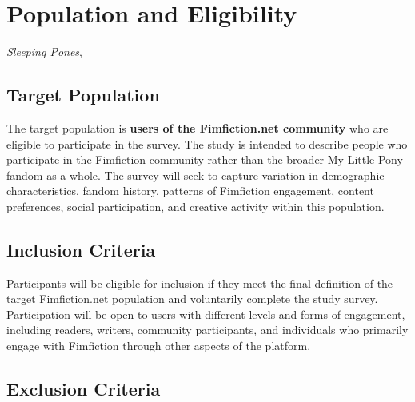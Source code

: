 \section{Population and Eligibility}

\begin{center}
	
	\textit{Sleeping Pones}, \parencite{mpnoirvector019}
\end{center}


\subsection{Target Population}

The target population is \textbf{users of the Fimfiction.net community} who are eligible to participate in the survey. The study is intended to describe people who participate in the Fimfiction community rather than the broader My Little Pony fandom as a whole. The survey will seek to capture variation in demographic characteristics, fandom history, patterns of Fimfiction engagement, content preferences, social participation, and creative activity within this population.


\subsection{Inclusion Criteria}

Participants will be eligible for inclusion if they meet the final definition of the target Fimfiction.net population and voluntarily complete the study survey. Participation will be open to users with different levels and forms of engagement, including readers, writers, community participants, and individuals who primarily engage with Fimfiction through other aspects of the platform.


\subsection{Exclusion Criteria}

